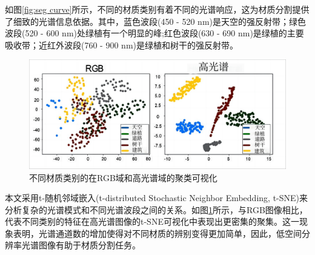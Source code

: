 \documentclass[
    type = master, %
    degree = academic,        %
    decl-page,  %
  ]{njuthesis}
\begin{document}
如图\ref{fig:seg curve}所示，不同的材质类别有着不同的光谱响应，这为材质分割提供了细致的光谱信息依据。其中，蓝色波段(450 - 520 nm)是天空的强反射带；绿色波段(520 - 600 nm)处绿植有一个明显的峰;红色波段(630 - 690 nm)是绿植的主要吸收带；近红外波段(760 - 900 nm)是绿植和树干的强反射带。

\begin{figure}[h]
	\centering
	\includegraphics[width=1.0\linewidth]{docs/fig-chap4/fig-4-tsne.pdf}
	\caption{不同材质类别的在RGB域和高光谱域的聚类可视化}
	\label{fig:seg tsne}
\end{figure}

本文采用t-随机邻域嵌入(t-distributed Stochastic Neighbor Embedding, t-SNE)\cite{J26}来分析复杂的光谱模式和不同光谱波段之间的关系。如图\ref{fig:seg tsne}所示，与RGB图像相比，代表不同类别的特征在高光谱图像的t-SNE可视化中表现出更密集的聚集。这一现象表明，光谱通道数的增加使得对不同材质的辨别变得更加简单，因此，低空间分辨率光谱图像有助于材质分割任务。


\end{document}
